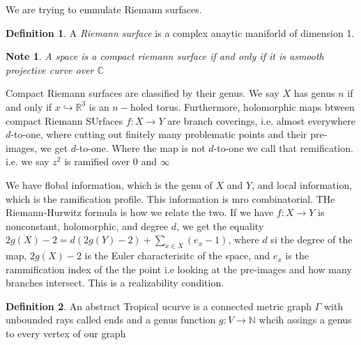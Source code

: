 \documentclass[12pt]{memoir}
\newtheorem{note}{Note}
\theoremstyle{definition}
\newtheorem{protodefinition}{Definition}[section]
\newenvironment{define}
   {\begin{protodefinition}}
   {\end{protodefinition}}
\def\RR{{\mathbb R}}
\def\CC{{\mathbb C}}
\def\NN{{\mathbb N}}
\begin{document}
We are trying to emmulate Riemann surfaces.


\begin{define}
    A \emph{Riemann surface} is a complex anaytic maniforld of dimension 1.
\end{define}



\begin{note}
    A space is a compact riemann surface if and only if it is  asmooth projective curve over $\CC$
\end{note}

Compact Riemann surfaces are classified by their genus. We say $X$ has genus $n$ if and only if $x \hookrightarrow \RR^3$ is an $n-$holed torus. Furthermore, holomorphic maps btween compact Riemann SUrfaces $f:X \rightarrow Y$ are branch coverings, i.e. almost everywhere $d$-to-one, where cutting out finitely many problematic points and their pre-images, we get $d$-to-one. Where the map is not $d$-to-one we call that remification. i.e. we say $z^2$ is ramified over $0$ and $\infty$


We have flobal information, which is the genu of $X$ and $Y$, and local information, which is the ramification profile. This information is mro combinatorial. THe Riemann-Hurwitz formula is how we relate the two. If we have $f:X \rightarrow Y$ is nonconstant, holomorphic, and degree $d$, we get the equality $2g(X)-2=d(2g(Y)-2) + \sum\limits_{x \in X} (e_x -1)$, where $d$ si the degree of the map, $2g(X)-2$ is the Euler characterisitc of the space, and $e_x$ is the rammification index of the the point i.e looking at the pre-images and how many branches intersect. This is a realizability condition.


\begin{define}
    An abstract Tropical ucurve is a connected metric graph $\Gamma$ with unbounded rays called ends and a genus function $g:V \rightarrow \NN$ whcih assings a genus to every vertex of our graph
\end{define}
\end{document}
